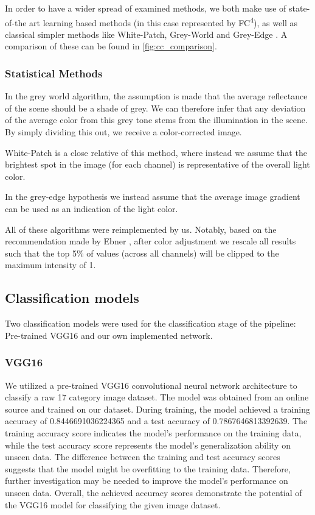 In order to have a wider spread of examined methods, we both make use of state-of-the art 
learning based methods (in this case represented by FC\textsuperscript{4}\cite{hu2017fc}), as well as classical simpler methods 
like White-Patch, Grey-World \cite{EbnerConstancy} and Grey-Edge \cite{van2005color}.
A comparison of these can be found in \ref{fig:cc_comparison}.

\subsubsection{Statistical Methods}

In the grey world algorithm, the assumption is made that the average reflectance of the scene should
be a shade of grey. We can therefore infer that any deviation of the average color from this grey tone stems from
the illumination in the scene. By simply dividing this out, we receive a color-corrected image.

White-Patch is a close relative of this method, where instead we assume that the brightest spot in the image (for each channel)
is representative of the overall light color.

In the grey-edge hypothesis we instead assume that the average image gradient can be used as an indication of the light color.

All of these algorithms were reimplemented by us. Notably, based on the recommendation made by Ebner \cite{EbnerConstancy},
after color adjustment we rescale all results such that the top 5\% of values (across all channels) will be clipped to
the maximum intensity of 1.

\subsection{Classification models}

Two classification models were used for the classification stage of the pipeline: Pre-trained VGG16 and our own implemented network. %

\subsubsection{VGG16}
We utilized a pre-trained VGG16 convolutional neural network architecture to classify a raw 17 category image dataset. 
The model was obtained from an online source and trained on our dataset. During training, the model achieved a training accuracy of 0.8446691036224365 and a test accuracy of 0.7867646813392639. 
The training accuracy score indicates the model's performance on the training data, while the test accuracy score represents the model's generalization ability on unseen data. 
The difference between the training and test accuracy scores suggests that the model might be overfitting to the training data. Therefore, further investigation may be needed to improve the model's performance on unseen data.
Overall, the achieved accuracy scores demonstrate the potential of the VGG16 model for classifying the given image dataset.

